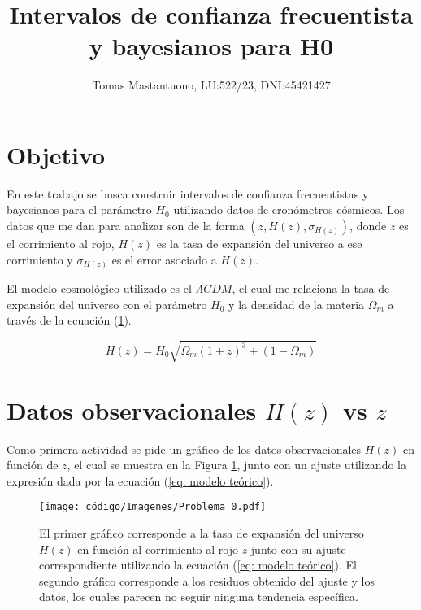 \documentclass[]{article}
\title{Intervalos de confianza frecuentista y bayesianos para H0}
\author{Tomas Mastantuono, LU:522/23, DNI:45421427}
\date{}
\begin{document}
\maketitle

\section*{Objetivo}
En este trabajo se busca construir intervalos de confianza frecuentistas y bayesianos para el parámetro $H_0$ utilizando datos de cronómetros cósmicos. Los datos que me dan para
analizar son de la forma $\left( z, H\left(z\right), \sigma_{H\left(z\right)} \right)$, donde $z$ es el corrimiento al rojo, $H\left(z\right)$ es la tasa de expansión del universo
a ese corrimiento y $\sigma_{H\left(z\right)}$ es el error asociado a $H\left(z\right)$.

El modelo cosmológico utilizado es el $\Lambda CDM$, el cual me relaciona la tasa de expansión del universo con el parámetro $H_0$ y la densidad de la materia $\Omega_m$ a través
de la ecuación (\ref{fig: ajuste modelo H}).

\begin{equation}
    H\left(z\right) = H_0 \sqrt{ \Omega_m \left(1 + z\right)^3 + \left(1 - \Omega_m\right) }
    \label{eq: modelo teórico}
\end{equation}

\section{Datos observacionales $H\left(z\right)$ vs $z$}
Como primera actividad se pide un gráfico de los datos observacionales $H\left(z\right)$ en función de $z$, el cual se muestra en la Figura \ref{fig: ajuste modelo H}, junto con
un ajuste utilizando la expresión dada por la ecuación (\ref{eq: modelo teórico}).

\begin{figure}[H]
    \centering
    \texttt{[image: código/Imagenes/Problema\_0.pdf]}
    \captionsetup{justification=centering}
    \captionsetup{font=footnotesize}
    \caption{El primer gráfico corresponde a la tasa de expansión del universo $H\left(z\right)$ en función al corrimiento al rojo $z$ junto con su ajuste correspondiente utilizando la 
    ecuación (\ref{eq: modelo teórico}). El segundo gráfico corresponde a los residuos obtenido del ajuste y los datos, los cuales parecen no seguir ninguna tendencia específica.}
    \label{fig: ajuste modelo H}
\end{figure} 
\end{document}
